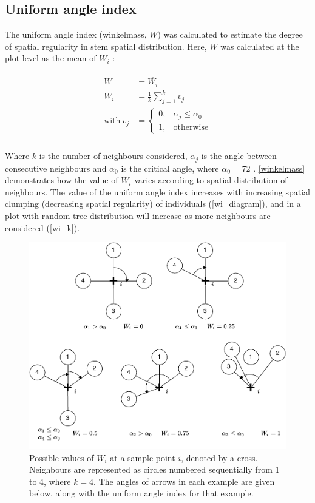 \documentclass[11pt,a4paper]{article}
\begin{document}
\subsection{Uniform angle index}

The uniform angle index (winkelmass, $W$) was calculated to estimate the degree of spatial regularity in stem spatial distribution. Here, $W$ was calculated at the plot level as the mean of $W_{i}$ \citep{Gadow2002}: 

\begin{align}
\begin{split}
	W &= \overline{W_{i}} \\
	W_{i} &= \frac{1}{k} \sum_{j=1}^{k} v_{j} \\
	\text{with}\ v_{j} &= \begin{cases}
		0,& \alpha_{j} \le \alpha_{0} \\
		1,& \text{otherwise}
	\end{cases} \\
\end{split}
\end{align}

Where $k$ is the number of neighbours considered, $\alpha_{j}$ is the angle between consecutive neighbours and $\alpha_{0}$ is the critical angle, where $\alpha_{0} = 72$\textdegree{} \citep{Hui2002}. \autoref{winkelmass} demonstrates how the value of $W_{i}$ varies according to spatial distribution of neighbours. The value of the uniform angle index increases with increasing spatial clumping (decreasing spatial regularity) of individuals (\autoref{wi_diagram}), and in a plot with random tree distribution will increase as more neighbours are considered (\autoref{wi_k}). 

\begin{figure}
\centering
	\includegraphics[width=\linewidth]{winkelmass}
	\caption{Possible values of $W_{i}$ at a sample point $i$, denoted by a cross. Neighbours are represented as circles numbered sequentially from 1 to 4, where $k = 4$. The angles of arrows in each example are given below, along with the uniform angle index for that example.}
	\label{winkelmass}
\end{figure}
\end{document}
